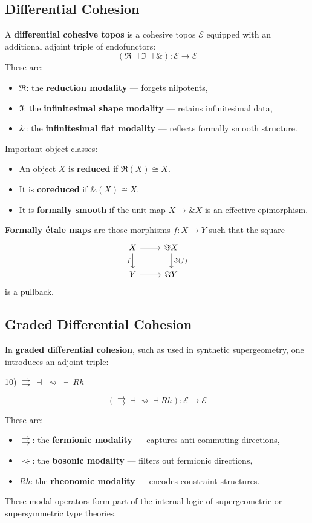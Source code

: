 \documentclass{article}
\begin{document}
\newpage
\subsection{Differential Cohesion}

A \textbf{differential cohesive topos} is a cohesive topos $\mathcal{E}$ equipped with an additional adjoint triple of endofunctors:
\[
(\Re \dashv \Im \dashv \&) : \mathcal{E} \to \mathcal{E}
\]
These are:
\begin{itemize}
  \item $\Re$: the \textbf{reduction modality} — forgets nilpotents,
  \item $\Im$: the \textbf{infinitesimal shape modality} — retains infinitesimal data,
  \item $\&$: the \textbf{infinitesimal flat modality} — reflects formally smooth structure.
\end{itemize}

Important object classes:
\begin{itemize}
  \item An object $X$ is \textbf{reduced} if $\Re(X) \cong X$.
  \item It is \textbf{coreduced} if $\&(X) \cong X$.
  \item It is \textbf{formally smooth} if the unit map $X \to \& X$ is an effective epimorphism.
\end{itemize}

\textbf{Formally étale maps} are those morphisms \( f: X \to Y \) such that the square
\[
\begin{tikzcd}
X \arrow[r] \arrow[d, "f"'] & \Im X \arrow[d, "\Im(f)"] \\
Y \arrow[r] & \Im Y
\end{tikzcd}
\]
is a pullback.

\newpage
\subsection{Graded Differential Cohesion}

In \textbf{graded differential cohesion}, such as used in synthetic supergeometry, one introduces an adjoint triple:


10) $\rightrightarrows\ \dashv\ \rightsquigarrow\ \dashv\ Rh$

\[
(\rightrightarrows \dashv \rightsquigarrow \dashv Rh) : \mathcal{E} \to \mathcal{E}
\]

These are:
\begin{itemize}
  \item $\rightrightarrows$: the \textbf{fermionic modality} — captures anti-commuting directions,
  \item $\rightsquigarrow$: the \textbf{bosonic modality} — filters out fermionic directions,
  \item $Rh$: the \textbf{rheonomic modality} — encodes constraint structures.
\end{itemize}

These modal operators form part of the internal logic of supergeometric or supersymmetric type theories.
\end{document}
